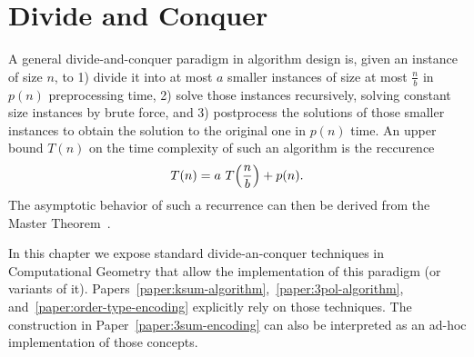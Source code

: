 \chapter{\done Divide and Conquer}

A general divide-and-conquer paradigm in algorithm design is,
given an instance of size \(n\), to 1) divide it into at most
\(a\) smaller instances of size at most \(\frac{n}{b}\) in \(p(n)\)
preprocessing time, 2) solve those instances recursively,
solving constant size instances by brute force, and 3) postprocess the
solutions of those smaller instances to obtain the solution to the original
one in \(p(n)\) time.
%
An upper bound \(T(n)\) on the time complexity of such an algorithm is the
reccurence
\begin{displaymath}
	T(n) = a \,\, T\mleft(\frac nb\mright) + p(n).
\end{displaymath}
%
The asymptotic behavior of such a recurrence can then be derived from the
Master Theorem~\cite{BHS80,CLRS09}.

In this chapter we expose standard divide-an-conquer techniques in
Computational Geometry that allow the implementation of this paradigm (or
variants of it).
%
Papers~\ref{paper:ksum-algorithm},~\ref{paper:3pol-algorithm},
and~\ref{paper:order-type-encoding} explicitly rely on those techniques.
%
The construction in
Paper~\ref{paper:3sum-encoding} can also be interpreted as an ad-hoc
implementation of those concepts.




